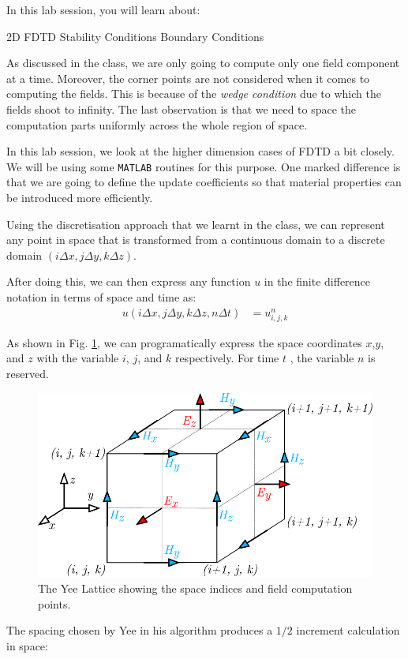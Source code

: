 \documentclass[12pt]{article}
\begin{document}
In this lab session, you will learn about:
\begin{outline}
  \1 2D FDTD
  \1 Stability Conditions
  \1 Boundary Conditions
\end{outline}

As discussed in the class, we are only going to compute only one field component at a time. Moreover, the corner points are not considered when it comes to computing the fields. This is because of the \textit{wedge condition} due to which the fields shoot to infinity. The last observation is that we need to space the computation parts uniformly across the whole region of space.

In this lab session, we look at the higher dimension cases of FDTD a bit closely. We will be using some \texttt{MATLAB} routines for this purpose. One marked difference is that we are going to define the update coefficients so that material properties can be introduced more efficiently.

Using the discretisation approach that we learnt in the class, we can represent any point in space that is transformed from a continuous domain to a discrete domain $(i\Delta x,j\Delta y,k \Delta z)$.

After doing this, we can then express any function $u$ in the finite difference notation in terms of space and time as:
\begin{align}
  u(i\Delta x,j\Delta y,k \Delta z, n \Delta t) & = u_{i,j,k}^n
\end{align}

As shown in Fig. \ref{fig:yee_lattice}, we can programatically express the space coordinates $x$,$y$, and $z$ with the variable $i$, $j$, and $k$ respectively. For time $t$ , the variable $n$ is reserved.

\begin{figure}[h!]
  \centering
  \includegraphics[width=.5\textwidth]{yee lattice.pdf}
  \caption{The Yee Lattice showing the space indices and field computation points.}
  \label{fig:yee_lattice}
\end{figure}

The spacing chosen by Yee in his algorithm produces a $1/2$ increment calculation in space:
\end{document}
